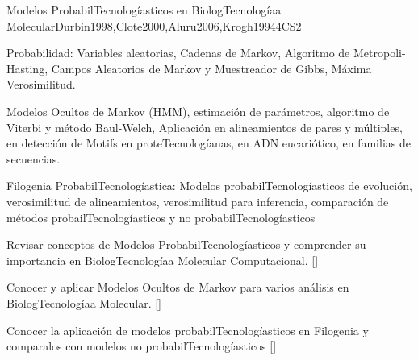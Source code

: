 \begin{syllabus}
\begin{unit}{Modelos ProbabilTecnologíasticos en BiologTecnologíaa Molecular}{}{Durbin1998,Clote2000,Aluru2006,Krogh1994}{4}{CS2}
   \begin{topics}
    \item Probabilidad: Variables aleatorias, Cadenas de Markov, Algoritmo de Metropoli-Hasting, Campos Aleatorios de Markov y Muestreador de Gibbs, Máxima Verosimilitud.
    \item Modelos Ocultos de Markov (HMM), estimación de parámetros, algoritmo de Viterbi y método Baul-Welch, Aplicación en alineamientos de pares y múltiples, en detección de Motifs en proteTecnologíanas, en ADN eucariótico, en familias de secuencias.
		\item Filogenia ProbabilTecnologíastica: Modelos probabilTecnologíasticos de evolución, verosimilitud de alineamientos, verosimilitud para inferencia, comparación de métodos probailTecnologíasticos y no probabilTecnologíasticos
   \end{topics}
   \begin{learningoutcomes}
      \item  Revisar conceptos de Modelos ProbabilTecnologíasticos y comprender su importancia en BiologTecnologíaa Molecular Computacional. [\Assessment]
	  \item Conocer y aplicar Modelos Ocultos de Markov para varios análisis en BiologTecnologíaa Molecular. [\Usage]
		\item Conocer la aplicación de modelos probabilTecnologíasticos en Filogenia y comparalos con modelos no probabilTecnologíasticos [\Assessment]
   \end{learningoutcomes}
\end{unit}



\begin{coursebibliography}
\end{coursebibliography}

\end{syllabus}
